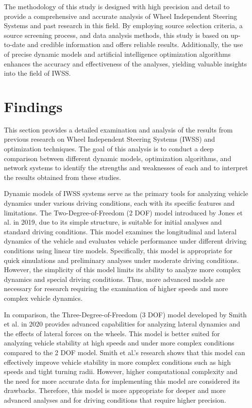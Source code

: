 \documentclass[a4paper,10pt]{article}
\begin{document}
        The methodology of this study is designed with high precision and detail to provide a comprehensive and accurate analysis of Wheel Independent Steering Systems and past research in this field. By employing source selection criteria, a source screening process, and data analysis methods, this study is based on up-to-date and credible information and offers reliable results. Additionally, the use of precise dynamic models and artificial intelligence optimization algorithms enhances the accuracy and effectiveness of the analyses, yielding valuable insights into the field of IWSS.

    \section{Findings}

        This section provides a detailed examination and analysis of the results from previous research on Wheel Independent Steering Systems (IWSS) and optimization techniques. The goal of this analysis is to conduct a deep comparison between different dynamic models, optimization algorithms, and network systems to identify the strengths and weaknesses of each and to interpret the results obtained from these studies.

        Dynamic models of IWSS systems serve as the primary tools for analyzing vehicle dynamics under various driving conditions, each with its specific features and limitations. The Two-Degree-of-Freedom (2 DOF) model introduced by Jones et al. in 2019, due to its simple structure, is suitable for initial analyses and standard driving conditions. This model examines the longitudinal and lateral dynamics of the vehicle and evaluates vehicle performance under different driving conditions using linear tire models. Specifically, this model is appropriate for quick simulations and preliminary analyses under moderate driving conditions. However, the simplicity of this model limits its ability to analyze more complex dynamics and special driving conditions. Thus, more advanced models are necessary for research requiring the examination of higher speeds and more complex vehicle dynamics.
    
        In comparison, the Three-Degree-of-Freedom (3 DOF) model developed by Smith et al. in 2020 provides advanced capabilities for analyzing lateral dynamics and the effects of lateral forces on the wheels. This model is better suited for analyzing vehicle stability at high speeds and under more complex conditions compared to the 2 DOF model. Smith et al.'s research shows that this model can effectively improve vehicle stability in more complex conditions such as high speeds and tight turning radii. However, higher computational complexity and the need for more accurate data for implementing this model are considered its drawbacks. Therefore, this model is more appropriate for deeper and more advanced analyses and for driving conditions that require higher precision.
    
\end{document}
